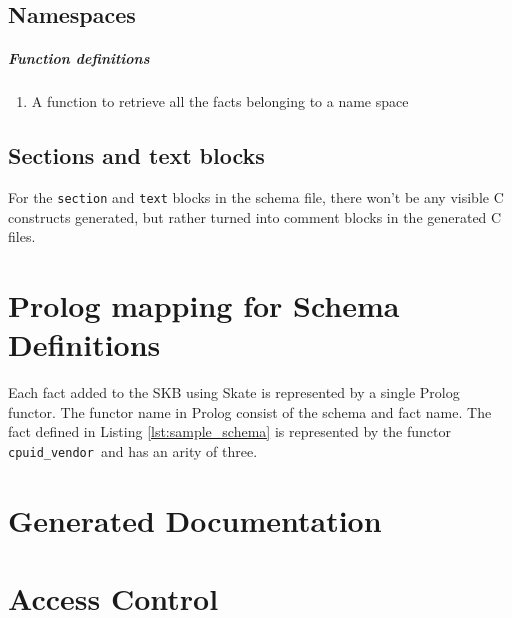 \documentclass[a4paper,11pt,twoside]{report}
\begin{document}
{{

\section{Namespaces}

\paragraph{Function definitions}
\begin{enumerate}
    \item A function to retrieve all the facts belonging to a name space
\end{enumerate}


\section{Sections and text blocks}
For the \texttt{section} and \texttt{text} blocks in the schema file, there
won't be any visible C constructs generated, but rather turned into comment
blocks in the generated C files.




\chapter{Prolog mapping for Schema Definitions}
\label{chap:prologmapping}

Each fact added to the SKB using Skate is represented by a single Prolog
functor.  The functor name in Prolog consist of the schema and fact name.  The
fact defined in Listing \ref{lst:sample_schema} is represented by the functor
\lstinline!cpuid_vendor!~and has an arity of three.


\chapter{Generated Documentation}
\label{chap:documentation}


\chapter{Access Control}
\label{chap:accesscontrol}

}}
\end{document}
